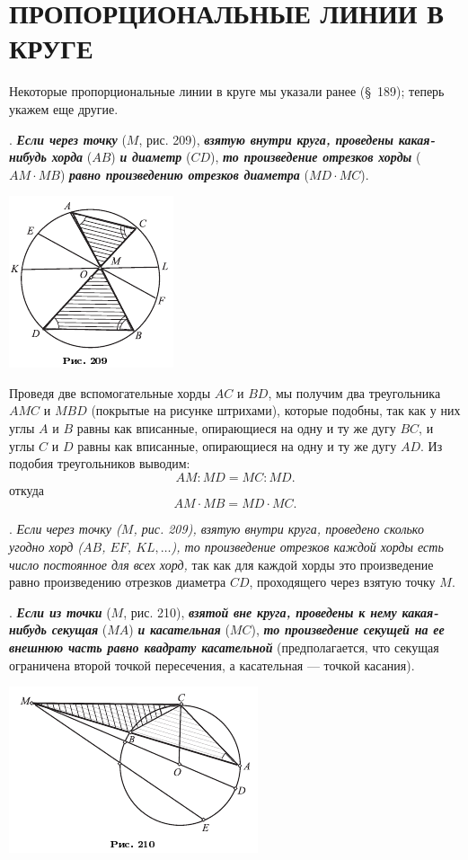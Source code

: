\documentclass[oneside]{book}
\begin{document}
\section{ПРОПОРЦИОНАЛЬНЫЕ ЛИНИИ В КРУГЕ}

Некоторые пропорциональные линии в круге мы указали ранее (§~189);
теперь укажем еще другие.

.
\textbf{\emph{Если через точку}} ($M$, рис. 209), \textbf{\emph{взятую внутри круга, проведены какая-нибудь хорда}} ($AB$) \textbf{\emph{и диаметр}} ($CD$), \textbf{\emph{то произведение отрезков хорды}} ($AM\cdot  MB$) \textbf{\emph{равно произведению отрезков диаметра}} ($MD\cdot  MC$).

\includegraphics{pics/ris-209}

Проведя две вспомогательные хорды $AC$ и $BD$, мы получим два треугольника $AMC$ и $MBD$ (покрытые на рисунке штрихами), которые подобны, так как у них углы $A$ и $B$ равны как вписанные, опирающиеся на одну и ту же дугу $BC$, и углы $C$ и $D$ равны как вписанные, опирающиеся на одну и ту же дугу $AD$.
Из подобия треугольников выводим:
\[AM:MD=MC:MD.\]
откуда
\[AM\cdot  MB=MD\cdot  MC.\]

.
\emph{Если через точку \emph{($M$, рис. 209),} взятую внутри круга, проведено сколько угодно хорд ($AB$, $EF$, $KL,\dots$), то произведение отрезков каждой хорды есть число постоянное для всех хорд,} так как для каждой хорды это произведение равно произведению отрезков диаметра $CD$, проходящего через взятую точку $M$.

.
\textbf{\emph{Если из точки}} ($M$, рис. 210), \textbf{\emph{взятой вне круга, проведены к нему какая-нибудь секущая}} ($MA$) \textbf{\emph{и касательная}} ($MC$), \textbf{\emph{то произведение секущей на ее внешнюю часть равно квадрату касательной}} (предполагается, что секущая ограничена второй точкой пересечения, а касательная — точкой касания).

\includegraphics{pics/ris-210}
\end{document}
